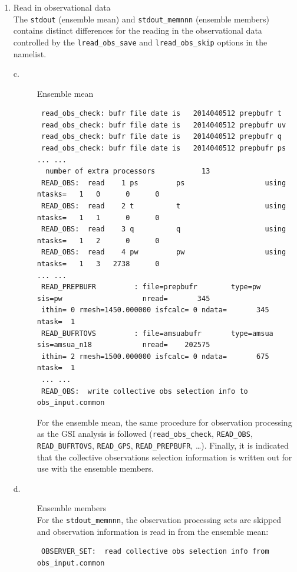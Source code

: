 \begin{enumerate}
\item Read in observational data \\

The \verb|stdout| (ensemble mean) and \verb|stdout_memnnn| (ensemble members) contains distinct differences for the reading in the observational data controlled by the \verb|lread_obs_save| and \verb|lread_obs_skip| options in the namelist.\\
\begin{description}
\item[ c.] Ensemble mean
\begin{scriptsize}
\begin{verbatim}
 read_obs_check: bufr file date is   2014040512 prepbufr t
 read_obs_check: bufr file date is   2014040512 prepbufr uv
 read_obs_check: bufr file date is   2014040512 prepbufr q
 read_obs_check: bufr file date is   2014040512 prepbufr ps
... ...
  number of extra processors           13
 READ_OBS:  read    1 ps         ps                   using ntasks=   1   0      0      0
 READ_OBS:  read    2 t          t                    using ntasks=   1   1      0      0
 READ_OBS:  read    3 q          q                    using ntasks=   1   2      0      0
 READ_OBS:  read    4 pw         pw                   using ntasks=   1   3   2738      0
... ...
 READ_PREPBUFR         : file=prepbufr        type=pw         sis=pw                   nread=       345 
 ithin= 0 rmesh=1450.000000 isfcalc= 0 ndata=       345 ntask=  1
 READ_BUFRTOVS         : file=amsuabufr       type=amsua      sis=amsua_n18            nread=    202575 
 ithin= 2 rmesh=1500.000000 isfcalc= 0 ndata=       675 ntask=  1
 ... ...
 READ_OBS:  write collective obs selection info to obs_input.common
\end{verbatim}
\end{scriptsize}

For the ensemble mean, the same procedure for observation processing as the GSI analysis is followed (\verb|read_obs_check|, \verb|READ_OBS|, \verb|READ_BUFRTOVS|, \verb|READ_GPS|, \verb|READ_PREPBUFR|, \ldots). Finally, it is indicated that the collective observations selection information is written out for use with the ensemble members.\\


\item[d.] Ensemble members \\
For the \verb|stdout_memnnn|, the observation processing sets are skipped and observation information is read in from the ensemble mean:
\begin{footnotesize}
\begin{verbatim}
 OBSERVER_SET:  read collective obs selection info from obs_input.common
\end{verbatim}
\end{footnotesize}


\end{description}
\end{enumerate}
